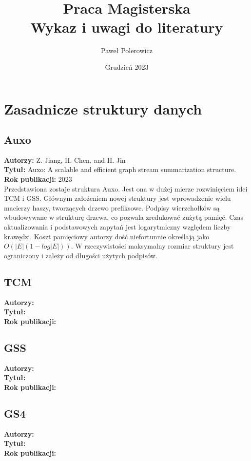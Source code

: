 \documentclass{article}
\title{\textbf{Praca Magisterska \\
    Wykaz i uwagi do literatury}}
\author{Paweł Polerowicz}
\date{Grudzień 2023}
\begin{document}
    \maketitle
    \section{Zasadnicze struktury danych}
        \subsection{Auxo\cite{Jiang_Chen_Jin_2023}}
            \textbf{Autorzy:} Z. Jiang, H. Chen, and H. Jin \\
            \textbf{Tytuł:} Auxo: A scalable and efficient graph stream summarization structure. \\
            \textbf{Rok publikacji:} 2023 \\

            Przedstawiona zostaje struktura Auxo. Jest ona w dużej mierze rozwinięciem idei TCM i GSS. Głównym założeniem nowej struktury jest wprowadzenie wielu macierzy haszy, tworzących drzewo prefiksowe. Podpisy wierzchołków są wbudowywane w strukturę drzewa, co pozwala zredukować zużytą pamięć. Czas aktualizowania i podstawowych zapytań jest logarytmiczny względem liczby krawędzi. Koszt pamięciowy autorzy dość niefortunnie określają jako $O(|E|(1 - log|E|))$. W rzeczywistości maksymalny rozmiar struktury jest ograniczony i zależy od długości użytych podpisów. 

        \subsection{TCM\cite{Tang_Chen_Mitra_2016}}
            \textbf{Autorzy: } \\
            \textbf{Tytuł: } \\
            \textbf{Rok publikacji: } \\

        \subsection{GSS\cite{Gou_Zou_Zhao_Yang_2023}}
            \textbf{Autorzy: } \\
            \textbf{Tytuł: } \\
            \textbf{Rok publikacji: } \\
        
        \subsection{GS4\cite{Ashrafi-Payaman_Kangavari_Hosseini_Fander_2020}}
            \textbf{Autorzy: } \\
            \textbf{Tytuł: } \\
            \textbf{Rok publikacji: } \\
        
\end{document}
